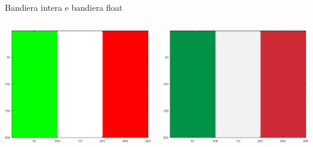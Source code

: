 \documentclass[aspectratio=169, handout]{beamer}
\begin{document}
\begin{frame}{Bandiera intera e bandiera float}
    \begin{columns}
        \begin{column}{0.5\textwidth}
            \includegraphics[width=0.9\linewidth]{./bandiera1.png}
        \end{column}
        \begin{column}{0.5\textwidth}
            \includegraphics[width=0.9\linewidth]{./bandiera2.png}
        \end{column}
    \end{columns}
\end{frame}
\end{document}
